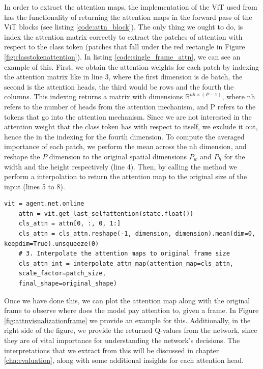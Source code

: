 In order to extract the attention maps, the implementation of the ViT used from \cite{caron2021emerging} has the functionality of returning the attention maps in the forward pass of the ViT blocks (see listing \ref{code:attn_block}). The only thing we ought to do, is index the attention matrix correctly to extract the patches of attention with respect to the class token (patches that fall under the red rectangle in Figure \ref{fig:classtokenattention}). In listing \ref{code:single_frame_attn}, we can see an example of this. First, we obtain the attention weights for each patch by indexing the attention matrix like  in line 3, where the first dimension is de batch, the second is the attention heads, the third would be rows and the fourth the columns. This indexing returns a matrix with dimensions $\mathbb{R}^{nh \times (P-1)}$, where nh refers to the number of heads from the attention mechanism, and P refers to the tokens that go into the attention mechanism. Since we are not interested in the attention weight that the class token has with respect to itself, we exclude it out, hence the  in the indexing for the fourth dimension. To compute the averaged importance of each patch, we perform the mean across the nh dimension, and reshape the $P$ dimension to the original spatial dimensions $P_w$ and $P_h$ for the width and the height respectively (line 4). Then, by calling the method  we perform a interpolation to return the attention map to the original size of the input (lines 5 to 8).

\begin{lstlisting}[caption={Attention map extractor for a single frame}, label={code:single_frame_attn}]
	vit = agent.net.online
	attn = vit.get_last_selfattention(state.float())
	cls_attn = attn[0, :, 0, 1:]
	cls_attn = cls_attn.reshape(-1, dimension, dimension).mean(dim=0, keepdim=True).unsqueeze(0)
	# 3. Interpolate the attention maps to original frame size
	cls_attn_int = interpolate_attn_map(attention_map=cls_attn, 
	scale_factor=patch_size,
	final_shape=original_shape)
\end{lstlisting}



Once we have done this, we can plot the attention map along with the original frame to observe where does the model pay attention to, given a frame. In Figure \ref{fig:attnvisualizationframe} we provide an example for this. Additionally, in the right side of the figure, we provide the returned Q-values from the network, since they are of vital importance for understanding the network's decisions. The interpretations that we extract from this will be discussed in chapter \ref{cha:evaluation}, along with some additional insights for each attention head.


